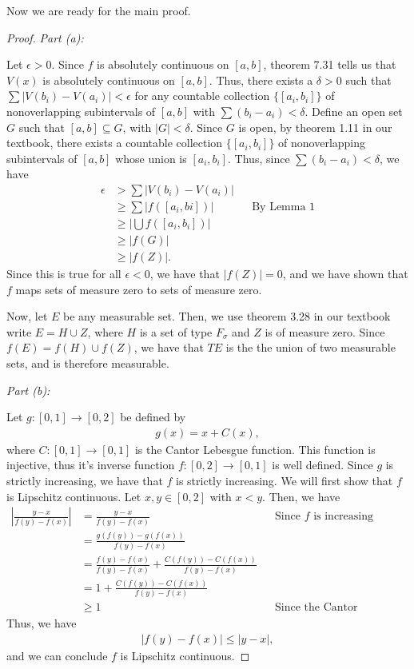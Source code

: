 \documentclass[10pt,a4paper]{article}
\makeatletter
\theoremstyle{theorem}
\newcommand{\proofpart}[2]{%
  \par
  \addvspace{\medskipamount}%
  \noindent\emph{Part #1: #2}\par\nobreak
  \addvspace{\smallskipamount}%
  \@afterheading
}
\theoremstyle{definition}
\makeatother
\begin{document}
Now we are ready for the main proof.
\begin{proof}
\proofpart{(a)}{} Let $\epsilon >0$. Since $f$ is absolutely continuous on $[a, b]$, theorem 7.31 tells us that $V(x)$ is absolutely continuous on $[a, b]$. Thus, there exists a $\delta > 0$ such that $\sum |V(b_i) - V(a_i)| < \epsilon$ for any countable collection $\{[a_i, b_i]\}$ of nonoverlapping subintervals of $[a, b]$ with $\sum (b_i - a_i) < \delta$. Define an open set $G$ such that $[a, b] \subseteq G$, with $|G| < \delta$. Since $G$ is open, by theorem 1.11 in our textbook, there exists a countable collection $\{[a_i, b_i]\}$ of nonoverlapping subintervals of $[a, b]$ whose union is $[a_i, b_i]$. Thus, since $\sum (b_i - a_i) < \delta$, we have
\begin{align*}
\epsilon &> \sum |V(b_i) - V(a_i)|\\
&\geq \sum |f([a_i, bi])| && \text{By Lemma 1}\\
&\geq \left|\bigcup f([a_i, b_i]) \right|\\
&\geq |f(G)|\\
&\geq |f(Z)|.
\end{align*}
Since this is true for all $\epsilon < 0$, we have that $|f(Z)| = 0$, and we have shown that $f$ maps sets of measure zero to sets of measure zero.

Now, let $E$ be any measurable set. Then, we use theorem 3.28 in our textbook write $E = H \cup Z$, where $H$ is a set of type $F_\sigma$ and $Z$ is of measure zero. Since $f(E) = f(H) \cup f(Z)$, we have that $TE$ is the the union of two measurable sets, and is therefore measurable.

\proofpart{(b)}{} Let $g:[0, 1] \to [0, 2]$ be defined by
\begin{align*}
g(x) = x + C(x),
\end{align*}
where $C:[0, 1] \to [0, 1]$ is the Cantor Lebesgue function. This function is injective, thus it's inverse function $f:[0, 2] \to [0, 1]$ is well defined. Since $g$ is strictly increasing, we have that $f$ is strictly increasing. We will first show that $f$ is Lipschitz continuous. Let $x, y \in [0, 2]$ with $x < y$. Then, we have
\begin{align*}
\left|\frac{y - x}{f(y) - f(x)} \right| &= \frac{y - x}{f(y) - f(x)} &&\text{Since } f \text{ is increasing}\\
&= \frac{g(f(y)) - g(f(x))}{f(y) - f(x)}\\
&= \frac{f(y) - f(x)}{f(y) - f(x)} + \frac{C(f(y)) - C(f(x))}{f(y) - f(x)}\\
&= 1 + \frac{C(f(y)) - C(f(x))}{f(y) - f(x)}\\
&\geq 1 &&\text{Since the Cantor Lebesgue function is non decreasing.}
\end{align*}
Thus, we have
\begin{align*}
|f(y) - f(x)| \leq |y - x|,
\end{align*}
and we can conclude $f$ is  Lipschitz continuous.


\end{proof}
\end{document}
